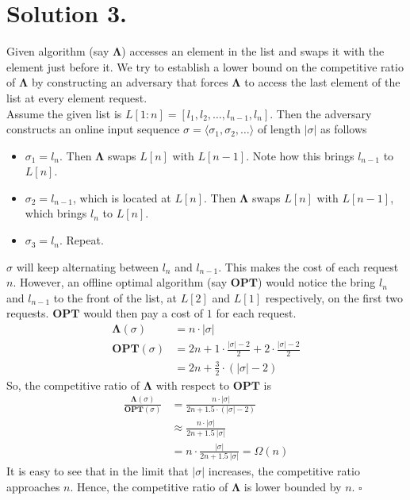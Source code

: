 \documentclass[11pt]{article}
\begin{document}
\section*{Solution 3.}
Given algorithm (say $\mathbf{\Lambda}$) accesses an element in the list and swaps it with the element just before it.
We try to establish a lower bound on the competitive ratio of $\mathbf{\Lambda}$ by constructing an adversary that
forces $\mathbf{\Lambda}$ to access the last element of the list at every element request. \\
Assume the given list is $L[1:n] = [l_{1}, l_{2}, \hdots, l_{n-1}, l_{n}]$. Then the adversary constructs an online input
sequence $\sigma = \langle \sigma_{1}, \sigma_{2}, \hdots \rangle$ of length $|\sigma|$ as follows
\begin{itemize}
    \item $\sigma_{1} = l_{n}$. Then $\mathbf{\Lambda}$ swaps $L[n]$ with $L[n-1]$. Note how this brings $l_{n-1}$ to $L[n]$.
    \item $\sigma_{2} = l_{n-1}$, which is located at $L[n]$. Then $\mathbf{\Lambda}$ swaps $L[n]$ with $L[n-1]$, which brings $l_{n}$ to $L[n]$.
    \item $\sigma_{3} = l_{n}$. Repeat.
\end{itemize}
$\sigma$ will keep alternating between $l_{n}$ and $l_{n-1}$. This makes the cost of each request $n$.
However, an offline optimal algorithm (say $\mathbf{OPT}$) would notice the bring $l_{n}$ and $l_{n-1}$ to the front of the
list, at $L[2]$ and $L[1]$ respectively, on the first two requests. $\mathbf{OPT}$ would then pay a cost of $1$ for each request.
\begin{align}
    \mathbf{\Lambda}(\sigma) &= n \cdot |\sigma| \\
    \mathbf{OPT}(\sigma) &= 2n + 1 \cdot \frac{|\sigma| - 2}{2} + 2 \cdot \frac{|\sigma| - 2}{2} \\
    &= 2n + \frac{3}{2} \cdot (|\sigma| - 2)
\end{align}
So, the competitive ratio of $\mathbf{\Lambda}$ with respect to $\mathbf{OPT}$ is
\begin{align}
    \frac{\mathbf{\Lambda}(\sigma)}{\mathbf{OPT}(\sigma)} &= \frac{n \cdot |\sigma|}{2n + 1.5 \cdot (|\sigma| - 2)} \\
    &\approx \frac{n \cdot |\sigma|}{2n + 1.5 \ |\sigma|}  \\
    &= n \cdot \frac{|\sigma|}{2n + 1.5 \ |\sigma|} = \Omega(n)
\end{align}
It is easy to see that in the limit that $|\sigma|$ increases, the competitive ratio approaches $n$.
Hence, the competitive ratio of $\mathbf{\Lambda}$ is lower bounded by $n$.
\hfill $\square$
\end{document}
